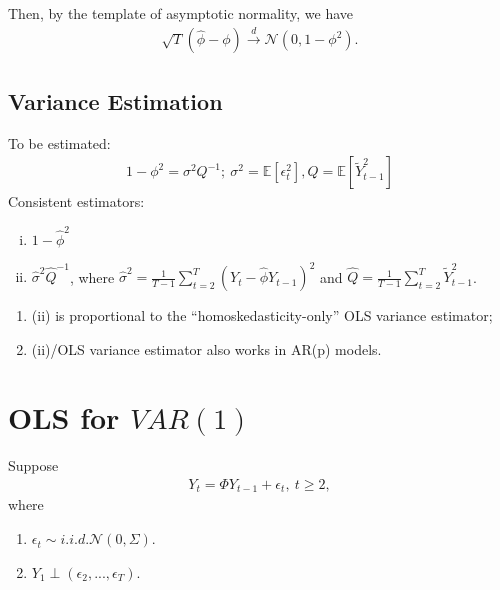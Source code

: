 \documentclass[11pt]{elegantbook}
\begin{document}
Then, by the template of asymptotic normality, we have
\begin{equation}
    \begin{aligned}
        \sqrt{T}\left(\hat{\phi}-\phi\right) \stackrel{d}{\longrightarrow} \mathcal{N}\left(0,1-\phi^2\right).
    \end{aligned}
    \nonumber
\end{equation}


\subsection*{Variance Estimation}
To be estimated:
\begin{equation}
    \begin{aligned}
        1-\phi^2=\sigma^2Q^{-1};\ \sigma^2=\mathbb{E}[\epsilon_t^2],Q=\mathbb{E}[\tilde{Y}_{t-1}^2]
    \end{aligned}
    \nonumber
\end{equation}
Consistent estimators:
\begin{enumerate}[(i).]
    \item $1-\hat{\phi}^2$
    \item $\hat{\sigma}^2\hat{Q}^{-1}$, where $\hat{\sigma}^2=\frac{1}{T-1}\sum_{t=2}^T\left(Y_t-\hat{\phi}Y_{t-1}\right)^2$ and $\hat{Q}=\frac{1}{T-1}\sum_{t=2}^T\tilde{Y}_{t-1}^2$.
\end{enumerate}
\begin{remark}
    \begin{enumerate}
        \item (ii) is proportional to the ``homoskedasticity-only'' OLS variance estimator;
        \item (ii)/OLS variance estimator also works in AR(p) models.
    \end{enumerate}
\end{remark}


\section{OLS for $VAR(1)$}
Suppose
\begin{equation}
    \begin{aligned}
        Y_t=\Phi Y_{t-1} + \epsilon_t, \ t\geq 2,
    \end{aligned}
    \nonumber
\end{equation}
where
\begin{enumerate}
    \item $\epsilon_t\sim {i.i.d.} \mathcal{N}(0,\Sigma)$.
    \item $Y_1\perp (\epsilon_2,...,\epsilon_T)$.
\end{enumerate}
\end{document}
